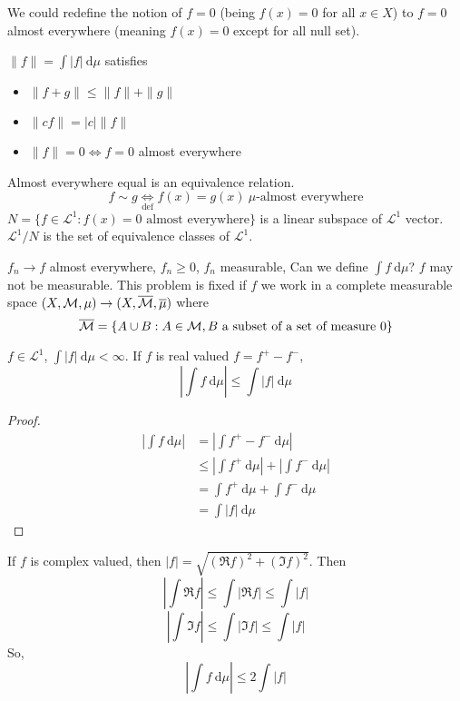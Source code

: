 We could redefine the notion of $f=0$ (being $f(x) = 0$ for all $x \in X$) to $f = 0$ almost everywhere (meaning $f(x) = 0$ except for all null set).


\begin{remark}
  $\|f\| = \int |f|\ \mathrm{d}\mu$ satisfies
  \begin{itemize}
    \item $\|f + g\| \le \|f\| + \|g\|$
    \item $\|c f\| = |c|\|f\|$
    \item $\|f\| = 0 \iff f = 0$ almost everywhere
  \end{itemize}
\end{remark}

\begin{remark}
  Almost everywhere equal is an equivalence relation.
  \[f \sim g \underset{\text{def}}\iff f(x) = g(x)\ \mu\text{-almost everywhere}\]
  $N = \{f \in\mathcal{L}^1 : f(x) = 0 \text{ almost everywhere}\}$ is a linear subspace of $\mathcal{L}^1$ vector.
  $\mathcal{L}^1/N$ is the set of equivalence classes of $\mathcal{L}^1$.
\end{remark}

$f_n \to f$ almost everywhere, $f_n \ge 0$, $f_n$ measurable, Can we define $\int f\ \mathrm{d}\mu$?
$f$ may not be measurable. This problem is fixed if $f$ we work in a complete measurable space
$(X, \mathcal M, \mu) \to (X, \overline{\mathcal M}, \overline{\mu})$
where 
\[\overline{\mathcal M} = \{A \cup B : A \in \mathcal M, B \text{ a subset of a set of measure }0\}\]

\begin{lemma}
$f \in \mathcal{L}^1$, $\int |f|\ \mathrm{d}\mu < \infty$. If $f$ is real valued $f = f^+ - f^-$,
\[\left|\int f\ \mathrm{d}\mu \right| \le \int |f| \ \mathrm{d}\mu\]
\end{lemma}
\begin{proof}
  \begin{align*}
    \left|\int f\ \mathrm{d}\mu \right| &= \left|\int f^+ - f^- \ \mathrm{d}\mu \right| \\
    &\le \left|\int f^+ \ \mathrm{d}\mu \right| + \left|\int f^- \ \mathrm{d}\mu \right| \\
    &= \int f^+ \ \mathrm{d}\mu + \int f^- \ \mathrm{d}\mu \\
    &= \int |f| \ \mathrm{d}\mu
  \end{align*}
\end{proof}

\begin{remark}
  If $f$ is complex valued, then $|f| = \sqrt{(\Re f)^2 + (\Im f)^2}$.
  Then
  \[\left|\int \Re f \right|\le \int |\Re f| \le \int |f|\]
  \[\left|\int \Im f \right|\le \int |\Im f| \le \int |f|\]
  So, 
  \[\left|\int f\ \mathrm{d}\mu \right| \le 2\int |f|\]
\end{remark}

